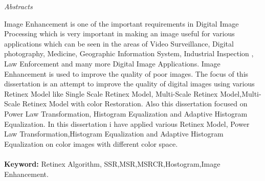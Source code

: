\newpage
\thispagestyle{empty}

\begin{center}
\emph{\LARGE Abstracts}\\[2.5cm]
\end{center}

\normalsize Image Enhancement is one of the important requirements in Digital Image
Processing which is very important in making an image useful for various applications which can be seen in the areas of Video Surveillance, Digital photography, Medicine, Geographic Information System, Industrial Inspection , Law Enforcement and many more Digital Image Applications. Image Enhancement is used to improve the quality of poor images. The focus of this dissertation is an attempt to improve the quality of digital images using various Retinex Model like Single Scale Retinex Model, Multi-Scale Retinex Model,Multi-Scale Retinex Model with color Restoration. Also this dissertation focused on Power Law Transformation, Histogram Equalization and Adaptive Histogram Equalization. In this dissertation i have applied various Retinex Model, Power Law Transformation,Histogram Equalization and Adaptive Histogram Equalization on color images with different color space.\\\\
\textbf{Keyword:} Retinex Algorithm, SSR,MSR,MSRCR,Hostogram,Image Enhancement. \\[1.0cm]







